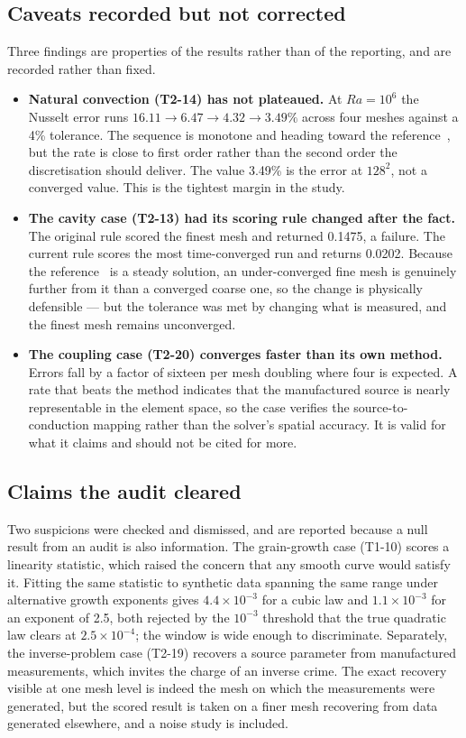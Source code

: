 \documentclass[11pt,a4paper]{article}
\begin{document}
\subsection{Caveats recorded but not corrected}
Three findings are properties of the results rather than of the reporting, and
are recorded rather than fixed.

\begin{itemize}
\item \textbf{Natural convection (T2-14) has not plateaued.} At $Ra=10^6$ the
  Nusselt error runs $16.11 \rightarrow 6.47 \rightarrow 4.32 \rightarrow 3.49\%$
  across four meshes against a 4\% tolerance. The sequence is monotone and
  heading toward the reference~\cite{devahldavis1983}, but the rate is close to
  first order rather than the second order the discretisation should deliver.
  The value 3.49\% is the error at $128^2$, not a converged value. This is the
  tightest margin in the study.
\item \textbf{The cavity case (T2-13) had its scoring rule changed after the
  fact.} The original rule scored the finest mesh and returned 0.1475, a
  failure. The current rule scores the most time-converged run and returns
  0.0202. Because the reference~\cite{ghia1982} is a steady solution, an
  under-converged fine mesh is genuinely further from it than a converged coarse
  one, so the change is physically defensible --- but the tolerance was met by
  changing what is measured, and the finest mesh remains unconverged.
\item \textbf{The coupling case (T2-20) converges faster than its own method.}
  Errors fall by a factor of sixteen per mesh doubling where four is expected.
  A rate that beats the method indicates that the manufactured source is nearly
  representable in the element space, so the case verifies the
  source-to-conduction mapping rather than the solver's spatial accuracy. It is
  valid for what it claims and should not be cited for more.
\end{itemize}

\subsection{Claims the audit cleared}
Two suspicions were checked and dismissed, and are reported because a null result
from an audit is also information. The grain-growth case (T1-10) scores a
linearity statistic, which raised the concern that any smooth curve would satisfy
it. Fitting the same statistic to synthetic data spanning the same range under
alternative growth exponents gives $4.4\times10^{-3}$ for a cubic law and
$1.1\times10^{-3}$ for an exponent of 2.5, both rejected by the $10^{-3}$
threshold that the true quadratic law clears at $2.5\times10^{-4}$; the window is
wide enough to discriminate. Separately, the inverse-problem case (T2-19)
recovers a source parameter from manufactured measurements, which invites the
charge of an inverse crime. The exact recovery visible at one mesh level is
indeed the mesh on which the measurements were generated, but the scored result
is taken on a finer mesh recovering from data generated elsewhere, and a noise
study is included.
\end{document}

